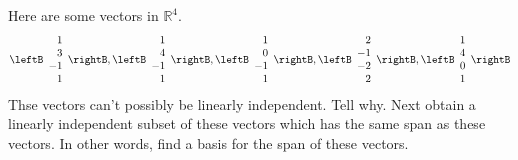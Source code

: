 \begin{enumialphparenastyle}
\begin{ex} Here are some vectors in $\mathbb{R}^{4}$. 
\begin{equation*}
\leftB 
\begin{array}{r}
1 \\ 
3 \\ 
-1 \\ 
1
\end{array}
\rightB ,\leftB 
\begin{array}{r}
1 \\ 
4 \\ 
-1 \\ 
1
\end{array}
\rightB ,\leftB 
\begin{array}{r}
1 \\ 
0 \\ 
-1 \\ 
1
\end{array}
\rightB ,\leftB 
\begin{array}{r}
2 \\ 
-1 \\ 
-2 \\ 
2
\end{array}
\rightB ,\leftB 
\begin{array}{r}
1 \\ 
4 \\ 
0 \\ 
1
\end{array}
\rightB
\end{equation*}
Thse vectors can't possibly be linearly independent. Tell why. Next obtain a
linearly independent subset of these vectors which has the same span as
these vectors. In other words, find a basis for the span of these vectors.
\end{ex}


\end{enumialphparenastyle}
